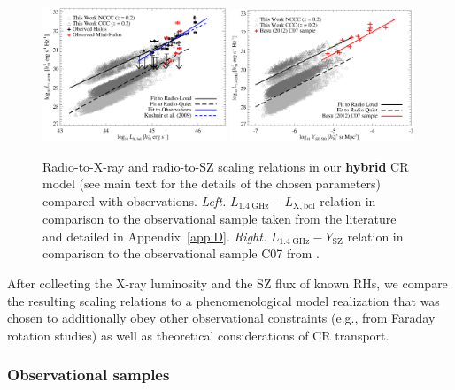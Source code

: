 \documentclass[traditabstract]{aa}
\def\C#1{{\bf #1}}
\newcommand{\rmn}{\mathrm}
\begin{document}
\begin{figure}[t]
\centering
\includegraphics[width=0.49\textwidth]{figures/PL_relation.eps}
\includegraphics[width=0.49\textwidth]{figures/PSZ_relation.eps}
\caption{Radio-to-X-ray and radio-to-SZ scaling relations in our \C{hybrid} CR model
  (see main text for the details of the chosen parameters) compared with
  observations.  \emph{Left.} $L_{1.4~\rmn{GHz}}-L_{\rmn{X,bol}}$ relation in
  comparison to the observational sample taken from the literature and detailed
  in Appendix~\ref{app:D}. \emph{Right.} $L_{1.4~\rmn{GHz}}-Y_{\rmn{SZ}}$
  relation in comparison to the observational sample C07 from
  \cite{2012MNRAS.421L.112B}.}
\label{fig:PLSZ}
\end{figure} 
 
After collecting the X-ray luminosity and the SZ flux of known RHs, we compare
the resulting scaling relations to a phenomenological model realization that was
chosen to additionally obey other observational constraints (e.g., from Faraday
rotation studies) as well as theoretical considerations of CR transport.


\subsubsection{Observational samples}
\end{document}
